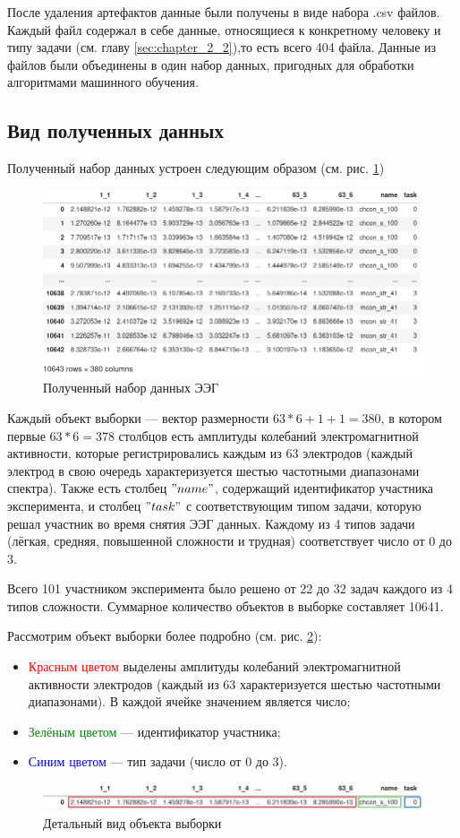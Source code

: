 После удаления артефактов данные были получены в виде набора .csv файлов. Каждый файл содержал
в себе данные, относящиеся к конкретному человеку и типу задачи (см. главу
\ref{sec:chapter_2_2}),то есть всего 404 файла. Данные из файлов были объединены
в один набор данных, пригодных для обработки алгоритмами машинного обучения.

\subsection{Вид полученных данных}

Полученный набор данных устроен следующим образом (см. рис. \ref{fig_3})\\
\begin{figure}[H]
    \centering
    \includegraphics[width=\linewidth]{images/3.png}
    \caption{Полученный набор данных ЭЭГ}
    \label{fig_3}
\end{figure}

Каждый объект выборки --- вектор размерности $63*6+1+1=380$, в котором первые $63*6=378$
столбцов есть амплитуды колебаний электромагнитной активности, которые регистрировались
каждым из 63 электродов (каждый электрод в свою очередь характеризуется шестью частотными
диапазонами спектра). Также есть столбец $"name"$, содержащий идентификатор участника
эксперимента, и столбец $"task"$ с соответствующим типом задачи, которую решал участник во
время снятия ЭЭГ данных. Каждому из 4 типов задачи (лёгкая, средняя, повышенной сложности
и трудная) соответствует число от 0 до 3.

Всего 101 участником эксперимента было решено от 22 до 32 задач каждого из 4 типов сложности.
Суммарное количество объектов в выборке составляет 10641.

Рассмотрим объект выборки более подробно (см. рис. \ref{fig_4}):
\begin{itemize}
    \item \textcolor{red}{Красным цветом} выделены амплитуды колебаний электромагнитной
    активности электродов (каждый из 63 характеризуется шестью частотными диапазонами).
    В каждой ячейке значением является число;
    \item \textcolor{green}{Зелёным цветом} --- идентификатор участника; 
    \item \textcolor{blue}{Синим цветом} --- тип задачи (число от 0 до 3).
\end{itemize}


\begin{figure}[H]
    \centering
    \includegraphics[width=\linewidth]{images/4.png}
    \caption{Детальный вид объекта выборки}
    \label{fig_4}
\end{figure}
